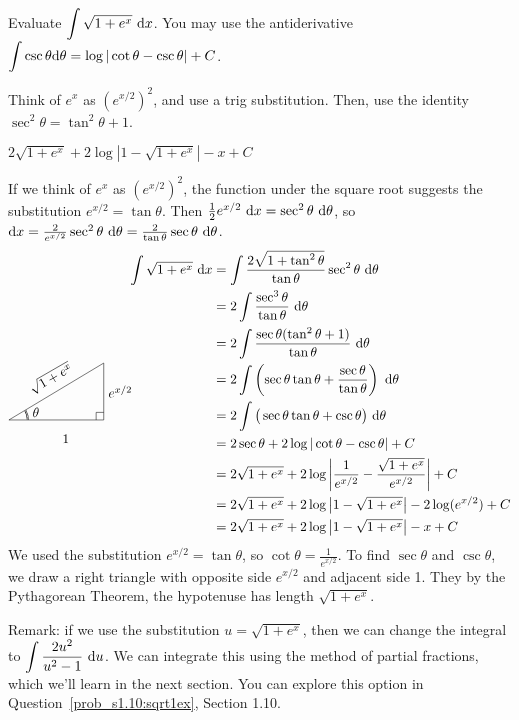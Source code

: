 \begin{question}\label{prob_s1.9:sqrt1ex}
Evaluate $\displaystyle\int \sqrt{1+e^x}~\mathrm{d}x$.
You may use the antiderivative $\displaystyle\int \csc \theta \mathrm{d}\theta = \log|\cot \theta - \csc \theta|+C$.
\end{question}
\begin{hint} Think of $e^x$ as $\left(e^{x/2}\right)^2$, and use a trig substitution. Then, use the identity $\sec^2 \theta = \tan^2 \theta +1$.
\end{hint}
\begin{answer}
$2\sqrt{1+e^x}+2\log\left| 1-\sqrt{1+e^x} \right|-x+C
$
\end{answer}
\begin{solution}
If we think of $e^x$ as $\left(e^{x/2}\right)^2$, the function under the square root suggests the substitution $e^{x/2}=\tan \theta$. Then $\frac{1}{2}e^{x/2}~\mathrm{d}x=\sec^2\theta~\mathrm{d}\theta$, so $\mathrm{d}x = \frac{2}{e^{x/2}}\sec^2\theta~\mathrm{d}\theta = \frac{2}{\tan\theta}\sec\theta~\mathrm{d}\theta$.
\begin{align*}
\int \sqrt{1+e^x}~\dee{x}&=\int\frac{2\sqrt{1+\tan^2 \theta}}{\tan\theta}\sec^2\theta~\dee{\theta}\\
&=2\int \frac{\sec^3\theta}{\tan\theta}~\dee{\theta}\\
&=2\int \frac{\sec\theta(\tan^2\theta+1)}{\tan\theta}~\dee{\theta}\\
&=2\int \left(\sec\theta \tan\theta + \frac{\sec \theta}{\tan\theta}\right)~\dee{\theta}\\
&=2\int\big( \sec\theta \tan\theta + \csc\theta\big)~\dee{\theta}\\
\smash{\trigtri{\theta}{1}{e^{x/2}}{\sqrt{1+e^x}}}\hspace{2cm}&=2\sec\theta + 2\log|\cot\theta-\csc\theta|+C\\
&=2\sqrt{1+e^x}+2\log\left| \frac{1}{e^{x/2}} - \frac{\sqrt{1+e^x}}{e^{x/2}} \right|+C\\
&=2\sqrt{1+e^x}+2\log\left| 1-\sqrt{1+e^x} \right|-2\log(e^{x/2})+C
\\&=2\sqrt{1+e^x}+2\log\left| 1-\sqrt{1+e^x} \right|-x+C
\end{align*}
We used the substitution $e^{x/2}=\tan\theta$, so $\cot\theta = \frac{1}{e^{x/2}}$. To find $\sec \theta$ and $\csc\theta$, we draw a right triangle with opposite side $e^{x/2}$ and adjacent side 1. They by the Pythagorean Theorem, the hypotenuse has length $\sqrt{1+e^x}$.

Remark: if we use the substitution $u=\sqrt{1+e^x}$, then we can change the integral to $\displaystyle\int \dfrac{2u^2}{u^2-1}~\mathrm{d}u$. We can integrate this using the method of partial fractions, which we'll learn in the next section. You can explore this option in Question~\ref{prob_s1.10:sqrt1ex}, Section 1.10.
\end{solution}

